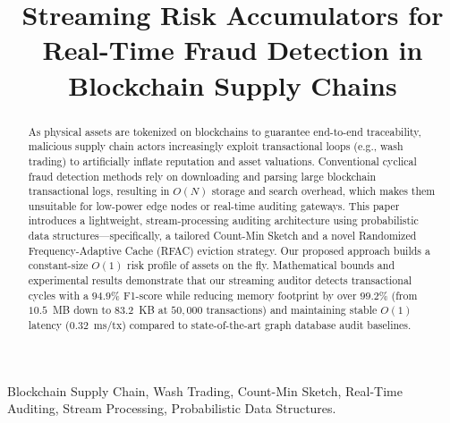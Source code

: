 \documentclass[conference]{IEEEtran}
\begin{document}
\title{Streaming Risk Accumulators for Real-Time Fraud Detection in Blockchain Supply Chains}
\author{
}

\maketitle
\maketitle
\thispagestyle{plain} %
\begin{abstract}
As physical assets are tokenized on blockchains to guarantee end-to-end traceability, malicious supply chain actors increasingly exploit transactional loops (e.g., wash trading) to artificially inflate reputation and asset valuations. Conventional cyclical fraud detection methods rely on downloading and parsing large blockchain transactional logs, resulting in $O(N)$ storage and search overhead, which makes them unsuitable for low-power edge nodes or real-time auditing gateways. This paper introduces a lightweight, stream-processing auditing architecture using probabilistic data structures—specifically, a tailored Count-Min Sketch and a novel Randomized Frequency-Adaptive Cache (RFAC) eviction strategy. Our proposed approach builds a constant-size $O(1)$ risk profile of assets on the fly. Mathematical bounds and experimental results demonstrate that our streaming auditor detects transactional cycles with a $94.9\%$ F1-score while reducing memory footprint by over $99.2\%$ (from $10.5$~MB down to $83.2$~KB at $50,000$ transactions) and maintaining stable $O(1)$ latency ($0.32$~ms/tx) compared to state-of-the-art graph database audit baselines.
\end{abstract}

\begin{IEEEkeywords}
Blockchain Supply Chain, Wash Trading, Count-Min Sketch, Real-Time Auditing, Stream Processing, Probabilistic Data Structures.
\end{IEEEkeywords}
\end{document}
